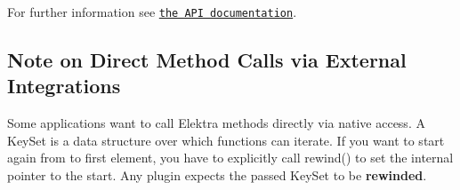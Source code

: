 For further information see \href{https://doc.libelektra.org/api/current/html/group__plugin.html}{\tt the A\+PI documentation}.

\subsection*{Note on Direct Method Calls via External Integrations}

Some applications want to call Elektra methods directly via native access. A {\ttfamily Key\+Set} is a data structure over which functions can iterate. If you want to start again from to first element, you have to explicitly call {\ttfamily rewind()} to set the internal pointer to the start. Any plugin expects the passed {\ttfamily Key\+Set} to be {\bfseries rewinded}. 